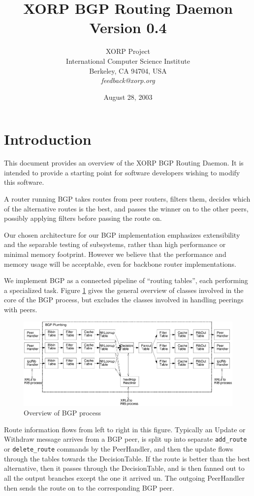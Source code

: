 \documentclass[11pt]{article}
\title{XORP BGP Routing Daemon \\
\vspace{1ex}
Version 0.4}
\author{ XORP Project					\\
	 International Computer Science Institute	\\
	 Berkeley, CA 94704, USA			\\
	 {\it feedback@xorp.org}
}
\date{August 28, 2003}
\begin{document}
\maketitle                            
\section{Introduction}
This document provides an overview of the XORP BGP Routing Daemon.  It
is intended to provide a starting point for software developers
wishing to modify this software.

A router running BGP takes routes from peer routers, filters them,
decides which of the alternative routes is the best, and passes the
winner on to the other peers, possibly applying filters before passing
the route on.

Our chosen architecture for our BGP implementation emphasizes
extensibility and the separable testing of subsystems, rather than
high performance or minimal memory footprint.  However we believe that
the performance and memory usage will be acceptable, even for backbone
router implementations.

We implement BGP as a connected pipeline of ``routing tables'', each
performing a specialized task.  Figure \ref{overview} gives the
general overview of classes involved in the core of the BGP process,
but excludes the classes involved in handling peerings with peers.
\begin{figure}[htb]
\centerline{\includegraphics[width=1.0\textwidth]{figs/overview}}
\vspace{.05in}
\caption{\label{overview}Overview of BGP process}
\end{figure}
Route information flows from left to right in this figure.  Typically
an Update or Withdraw message arrives from a BGP peer, is split up
into separate {\tt add\_route} or {\tt delete\_route} commands by the PeerHandler,
and then the update flows through the tables towards the
DecisionTable.  If the route is better than the best alternative, then
it passes through the DecisionTable, and is then fanned out to all the
output branches except the one it arrived un.  The outgoing
PeerHandler then sends the route on to the corresponding BGP peer.
\end{document}
